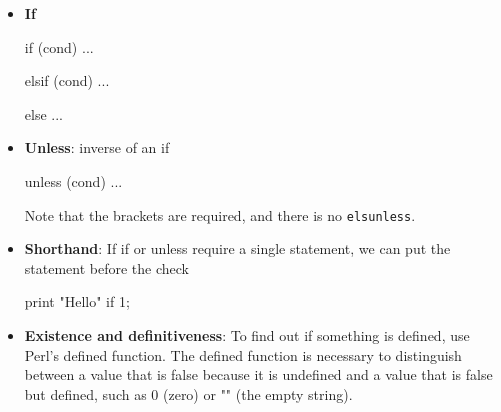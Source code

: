 \documentclass{report}
\begin{document}
\begin{itemize}
    \end{itemize}

    \pagebreak 
    \begin{itemize}
        \item \textbf{If}
            \bigbreak \noindent 
            \begin{perlcode}
                if (cond) {
                    ...
                }

                elsif (cond) {
                    ...
                }

                else {
                    ...
                }
            \end{perlcode}
        \item \textbf{Unless}: inverse of an if
            \bigbreak \noindent 
            \begin{perlcode}
                unless (cond) {
                    ...
                }
            \end{perlcode}
            \bigbreak \noindent 
            Note that the brackets are required, and there is no \texttt{elsunless}.
        \item \textbf{Shorthand}: If if or unless require a single statement, we can put the statement before the check
            \bigbreak \noindent 
            \begin{perlcode}
            print "Hello" if 1;
            \end{perlcode}
        \item \textbf{Existence and definitiveness}: To find out if something is defined, use Perl’s defined function. The defined function is necessary to distinguish between a value that is false because it is undefined and a value that is false but defined, such as 0 (zero) or "" (the empty string).
            \bigbreak \noindent 
\end{itemize}
\end{document}
